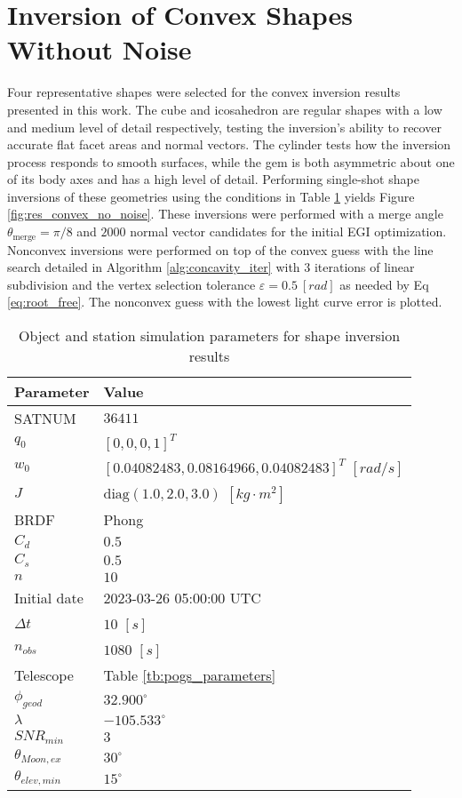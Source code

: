 \clearpage
\section{Inversion of Convex Shapes Without Noise}

Four representative shapes were selected for the convex inversion results presented in this work. The cube and icosahedron are regular shapes with a low and medium level of detail respectively, testing the inversion's ability to recover accurate flat facet areas and normal vectors. The cylinder tests how the inversion process responds to smooth surfaces, while the gem is both asymmetric about one of its body axes and has a high level of detail. Performing single-shot shape inversions of these geometries using the conditions in Table \ref{tb:cvx_props} yields Figure \ref{fig:res_convex_no_noise}. These inversions were performed with a merge angle $\theta_\mathrm{merge} = \pi / 8$ and $2000$ normal vector candidates for the initial EGI optimization. Nonconvex inversions were performed on top of the convex guess with the line search detailed in Algorithm \ref{alg:concavity_iter} with $3$ iterations of linear subdivision and the vertex selection tolerance $\varepsilon = 0.5 \: [rad]$ as needed by Eq \ref{eq:root_free}. The nonconvex guess with the lowest light curve error is plotted.

\begin{table}[]
  \centering
  \begin{tabular}{|l|l|}
  \hline
  \textbf{Parameter} & \textbf{Value} \\ \hline
  SATNUM & $36411$ \\ \hline
  $q_0$ & $\left[ 0, 0, 0, 1 \right]^T$ \\ \hline
  $w_0$ & $\left[ 0.04082483, 0.08164966, 0.04082483 \right]^T$ $[rad/s]$ \\ \hline
  $J$ & $\mathrm{diag}\left( 1.0, 2.0, 3.0 \right)$ $\left[ kg \cdot m^2 \right]$ \\ \hline
  BRDF & Phong \\ \hline
  $C_d$ & $0.5$ \\ \hline
  $C_s$ & $0.5$ \\ \hline
  $n$ & $10$ \\ \hline
  Initial date & 2023-03-26 05:00:00 UTC \\ \hline
  $\Delta t$ & $10$ $[s]$ \\ \hline
  $n_{obs}$ & $1080$ $[s]$ \\ \hline
  Telescope & Table \ref{tb:pogs_parameters} \\ \hline
  $\phi_{geod}$ & $32.900^\circ$ \\ \hline
  $\lambda$ & $-105.533^\circ$ \\ \hline
  $SNR_{min}$ & $3$ \\ \hline
  $\theta_{Moon,ex}$ & $30^\circ$ \\ \hline
  $\theta_{elev,min}$ & $15^\circ$ \\ \hline
  \end{tabular}
  \caption{Object and station simulation parameters for shape inversion results}
  \label{tb:cvx_props}
\end{table}

